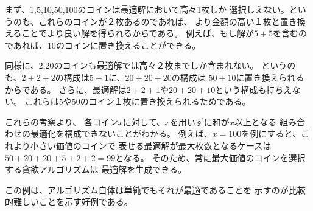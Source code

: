 まず、1,5,10,50,100のコインは最適解において高々1枚しか
選択しえない。というのも、これらのコインが２枚あるのであれば、
より金額の高い１枚と置き換えることでより良い解を得られるからである。
例えば、もし解が$5+5$を含むのであれば、$10$のコインに置き換えることができる。

同様に、2,20のコインも最適解では高々２枚までしか含まれない。
というのも、$2+2+2$の構成は$5+1$に、$20+20+20$の構成は
$50+10$に置き換えられるからである。
さらに、最適解は$2+2+1$や$20+20+10$という構成も持ちえない。
これらは$5$や$50$のコイン１枚に置き換えられるためである。

\begin{comment}
Using these observations,
we can show for each coin $x$ that
it is not possible to optimally construct
a sum $x$ or any larger sum by only using coins
that are smaller than $x$.
For example, if $x=100$, the largest optimal
sum using the smaller coins is  $50+20+20+5+2+2=99$.
Thus, the greedy algorithm that always selects
the largest coin produces the optimal solution.

This example shows that it can be difficult
to argue that a greedy algorithm works,
even if the algorithm itself is simple.
\end{comment}

これらの考察より、
各コイン$x$に対して、$x$を用いずに和が$x$以上となる
組み合わせの最適化を構成できないことがわかる。
例えば、$x=100$を例にすると、これより小さい価値のコインで
表せる最適解が最大枚数となるケースは$50+20+20+5+2+2=99$となる。
そのため、常に最大価値のコインを選択する貪欲アルゴリズムは
最適解を生成できる。

この例は、アルゴリズム自体は単純でもそれが最適であることを
示すのが比較的難しいことを示す好例である。

\begin{comment}
\subsubsection{General case}

In the general case, the coin set can contain any coins
and the greedy algorithm \emph{does not} necessarily produce
an optimal solution.

We can prove that a greedy algorithm does not work
by showing a counterexample
where the algorithm gives a wrong answer.
In this problem we can easily find a counterexample:
if the coins are $\{1,3,4\}$ and the target sum
is 6, the greedy algorithm produces the solution
$4+1+1$ while the optimal solution is $3+3$.

It is not known if the general coin problem
can be solved using any greedy algorithm\footnote{However, it is possible
to \emph{check} in polynomial time
if the greedy algorithm presented in this chapter works for
a given set of coins \cite{pea05}.}.
However, as we will see in Chapter 7,
in some cases,
the general problem can be efficiently
solved using a dynamic
programming algorithm that always gives the
correct answer.
\end{comment}

